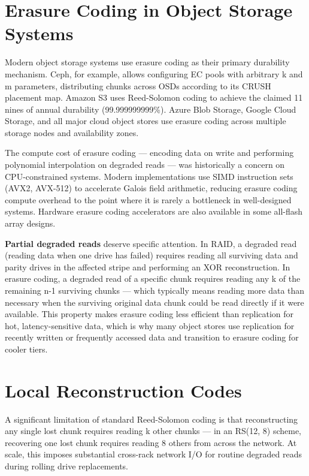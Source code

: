 \section{Erasure Coding in Object Storage Systems}
Modern object storage systems use erasure coding as their primary durability mechanism. Ceph, for example, allows configuring EC pools with arbitrary k and m parameters, distributing chunks across OSDs according to its CRUSH placement map. Amazon S3 uses Reed-Solomon coding to achieve the claimed 11 nines of annual durability (99.999999999\%). Azure Blob Storage, Google Cloud Storage, and all major cloud object stores use erasure coding across multiple storage nodes and availability zones.

The compute cost of erasure coding --- encoding data on write and performing polynomial interpolation on degraded reads --- was historically a concern on CPU-constrained systems. Modern implementations use SIMD instruction sets (AVX2, AVX-512) to accelerate Galois field arithmetic, reducing erasure coding compute overhead to the point where it is rarely a bottleneck in well-designed systems. Hardware erasure coding accelerators are also available in some all-flash array designs.

\textbf{Partial degraded reads} deserve specific attention. In RAID, a degraded read (reading data when one drive has failed) requires reading all surviving data and parity drives in the affected stripe and performing an XOR reconstruction. In erasure coding, a degraded read of a specific chunk requires reading any k of the remaining n-1 surviving chunks --- which typically means reading more data than necessary when the surviving original data chunk could be read directly if it were available. This property makes erasure coding less efficient than replication for hot, latency-sensitive data, which is why many object stores use replication for recently written or frequently accessed data and transition to erasure coding for cooler tiers.

\section{Local Reconstruction Codes}
A significant limitation of standard Reed-Solomon coding is that reconstructing any single lost chunk requires reading k other chunks --- in an RS(12, 8) scheme, recovering one lost chunk requires reading 8 others from across the network. At scale, this imposes substantial cross-rack network I/O for routine degraded reads during rolling drive replacements.

